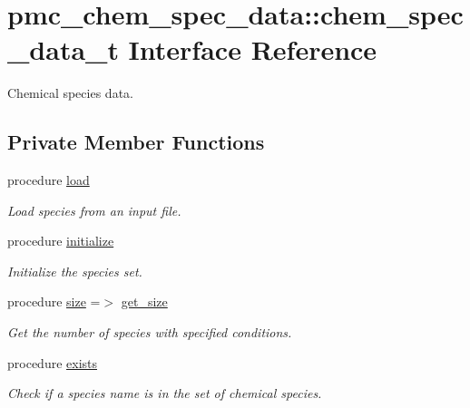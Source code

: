 \hypertarget{structpmc__chem__spec__data_1_1chem__spec__data__t}{}\section{pmc\+\_\+chem\+\_\+spec\+\_\+data\+:\+:chem\+\_\+spec\+\_\+data\+\_\+t Interface Reference}
\label{structpmc__chem__spec__data_1_1chem__spec__data__t}


Chemical species data.  


\subsection*{Private Member Functions}
\begin{DoxyCompactItemize}
\item 
procedure \mbox{\hyperlink{structpmc__chem__spec__data_1_1chem__spec__data__t_a661c3af278f7376aac94456d587735fd}{load}}
\begin{DoxyCompactList}\small\item\em Load species from an input file. \end{DoxyCompactList}\item 
procedure \mbox{\hyperlink{structpmc__chem__spec__data_1_1chem__spec__data__t_a2704024171c40dd51bf5531cc361599b}{initialize}}
\begin{DoxyCompactList}\small\item\em Initialize the species set. \end{DoxyCompactList}\item 
procedure \mbox{\hyperlink{structpmc__chem__spec__data_1_1chem__spec__data__t_aeb134a3cef81735b01958f69b55a4f2c}{size}} =$>$ \mbox{\hyperlink{namespacepmc__chem__spec__data_a37e8dbcc45d70654ab71aea9980405fe}{get\+\_\+size}}
\begin{DoxyCompactList}\small\item\em Get the number of species with specified conditions. \end{DoxyCompactList}\item 
procedure \mbox{\hyperlink{structpmc__chem__spec__data_1_1chem__spec__data__t_a3ef3439dda7eeb3c0b66dcfcd85f1f7e}{exists}}
\begin{DoxyCompactList}\small\item\em Check if a species name is in the set of chemical species. \end{DoxyCompactList}\item 

\end{DoxyCompactItemize}

